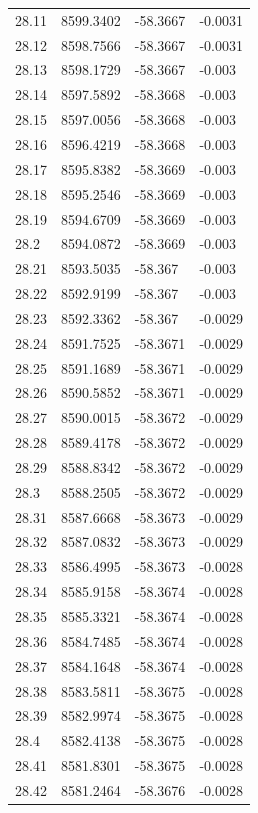 \begin{table}[H]
\begin{tabular}{llll}
28.11 & 8599.3402 & -58.3667 & -0.0031 \\
28.12 & 8598.7566 & -58.3667 & -0.0031 \\
28.13 & 8598.1729 & -58.3667 & -0.003 \\
28.14 & 8597.5892 & -58.3668 & -0.003 \\
28.15 & 8597.0056 & -58.3668 & -0.003 \\
28.16 & 8596.4219 & -58.3668 & -0.003 \\
28.17 & 8595.8382 & -58.3669 & -0.003 \\
28.18 & 8595.2546 & -58.3669 & -0.003 \\
28.19 & 8594.6709 & -58.3669 & -0.003 \\
28.2 & 8594.0872 & -58.3669 & -0.003 \\
28.21 & 8593.5035 & -58.367 & -0.003 \\
28.22 & 8592.9199 & -58.367 & -0.003 \\
28.23 & 8592.3362 & -58.367 & -0.0029 \\
28.24 & 8591.7525 & -58.3671 & -0.0029 \\
28.25 & 8591.1689 & -58.3671 & -0.0029 \\
28.26 & 8590.5852 & -58.3671 & -0.0029 \\
28.27 & 8590.0015 & -58.3672 & -0.0029 \\
28.28 & 8589.4178 & -58.3672 & -0.0029 \\
28.29 & 8588.8342 & -58.3672 & -0.0029 \\
28.3 & 8588.2505 & -58.3672 & -0.0029 \\
28.31 & 8587.6668 & -58.3673 & -0.0029 \\
28.32 & 8587.0832 & -58.3673 & -0.0029 \\
28.33 & 8586.4995 & -58.3673 & -0.0028 \\
28.34 & 8585.9158 & -58.3674 & -0.0028 \\
28.35 & 8585.3321 & -58.3674 & -0.0028 \\
28.36 & 8584.7485 & -58.3674 & -0.0028 \\
28.37 & 8584.1648 & -58.3674 & -0.0028 \\
28.38 & 8583.5811 & -58.3675 & -0.0028 \\
28.39 & 8582.9974 & -58.3675 & -0.0028 \\
28.4 & 8582.4138 & -58.3675 & -0.0028 \\
28.41 & 8581.8301 & -58.3675 & -0.0028 \\
28.42 & 8581.2464 & -58.3676 & -0.0028 \\

\end{tabular}
\end{table}
